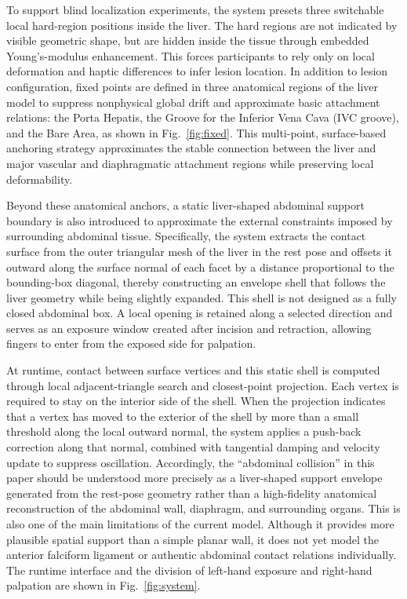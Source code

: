 \documentclass{ieeeaccess}
\begin{document}
To support blind localization experiments, the system presets three switchable local hard-region positions inside the liver. The hard regions are not indicated by visible geometric shape, but are hidden inside the tissue through embedded Young's-modulus enhancement. This forces participants to rely only on local deformation and haptic differences to infer lesion location. In addition to lesion configuration, fixed points are defined in three anatomical regions of the liver model to suppress nonphysical global drift and approximate basic attachment relations: the Porta Hepatis, the Groove for the Inferior Vena Cava (IVC groove), and the Bare Area, as shown in Fig.~\ref{fig:fixed}. This multi-point, surface-based anchoring strategy approximates the stable connection between the liver and major vascular and diaphragmatic attachment regions while preserving local deformability.

Beyond these anatomical anchors, a static liver-shaped abdominal support boundary is also introduced to approximate the external constraints imposed by surrounding abdominal tissue. Specifically, the system extracts the contact surface from the outer triangular mesh of the liver in the rest pose and offsets it outward along the surface normal of each facet by a distance proportional to the bounding-box diagonal, thereby constructing an envelope shell that follows the liver geometry while being slightly expanded. This shell is not designed as a fully closed abdominal box. A local opening is retained along a selected direction and serves as an exposure window created after incision and retraction, allowing fingers to enter from the exposed side for palpation.

At runtime, contact between surface vertices and this static shell is computed through local adjacent-triangle search and closest-point projection. Each vertex is required to stay on the interior side of the shell. When the projection indicates that a vertex has moved to the exterior of the shell by more than a small threshold along the local outward normal, the system applies a push-back correction along that normal, combined with tangential damping and velocity update to suppress oscillation. Accordingly, the ``abdominal collision'' in this paper should be understood more precisely as a liver-shaped support envelope generated from the rest-pose geometry rather than a high-fidelity anatomical reconstruction of the abdominal wall, diaphragm, and surrounding organs. This is also one of the main limitations of the current model. Although it provides more plausible spatial support than a simple planar wall, it does not yet model the anterior falciform ligament or authentic abdominal contact relations individually. The runtime interface and the division of left-hand exposure and right-hand palpation are shown in Fig.~\ref{fig:system}.
\end{document}
